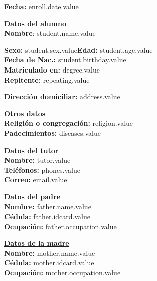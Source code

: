 \documentclass[12pt]{article}
\newcommand{\aField}[1]{#1}
\newcommand{\enrollDate}{enroll.date.value}
\newcommand{\studentName}{student.name.value}
\newcommand{\studentBirthday}{student.birthday.value}
\newcommand{\studentAge}{student.age.value}
\newcommand{\studentSex}{student.sex.value}
\newcommand{\isRepeating}{repeating.value}
\newcommand{\degree}{degree.value}
\newcommand{\address}{address.value}
\newcommand{\religion}{religion.value}
\newcommand{\diseases}{diseases.value}
\newcommand{\tutor}{tutor.value}
\newcommand{\phones}{phones.value}
\newcommand{\email}{email.value}
\newcommand{\fatherName}{father.name.value}
\newcommand{\fatherIdcard}{father.idcard.value}
\newcommand{\fatherOccupation}{father.occupation.value}
\newcommand{\motherName}{mother.name.value}
\newcommand{\motherIdcard}{mother.idcard.value}
\newcommand{\motherOccupation}{mother.occupation.value}
\begin{document}
    \hfill \textbf{Fecha:} \enrollDate
    
    \textbf{\uline{Datos del alumno}}\\
    \textbf{Nombre}: \aField{\studentName}
    \par\vspace{1mm}
    \begin{minipage}[t]{0.49\textwidth}
        \textbf{Sexo:} \aField{\studentSex}\hspace{5mm}\textbf{Edad:} \aField{\studentAge}\\
        \textbf{Fecha de Nac.:} \aField{\studentBirthday}\\
        \textbf{Matriculado en:} \aField{\degree}\\
        \textbf{Repitente:} \aField{\isRepeating}
    \end{minipage}
    \hfill
    \begin{minipage}[t]{0.49\textwidth}
        \textbf{Dirección domiciliar:} \aField{\address}
    \end{minipage}
    \par\vspace{4mm}
    \begin{minipage}[t]{0.49\textwidth}
        \textbf{\uline{Otros datos}}\\
        \textbf{Religión o congregación:} \aField{\religion}\\
        \textbf{Padecimientos:} \aField{\diseases}
    \end{minipage}
    \hfill
    \begin{minipage}[t]{0.49\textwidth}
        \textbf{\uline{Datos del tutor}}\\
        \textbf{Nombre:} \aField{\tutor}\\
        \textbf{Teléfonos:} \aField{\phones}\\
        \textbf{Correo:} \aField{\email}
    \end{minipage}
    \par\vspace{4mm}
    \begin{minipage}[t]{0.49\textwidth}
        \textbf{\uline{Datos del padre}}\\
        \textbf{Nombre:} \aField{\fatherName}\\
        \textbf{Cédula:} \aField{\fatherIdcard}\\
        \textbf{Ocupación:} \aField{\fatherOccupation}
    \end{minipage}
    \hfill
    \begin{minipage}[t]{0.49\textwidth}
        \textbf{\uline{Datos de la madre}}\\
        \textbf{Nombre:} \aField{\motherName}\\
        \textbf{Cédula:} \aField{\motherIdcard}\\
        \textbf{Ocupación:} \aField{\motherOccupation}
    \end{minipage}
\end{document}

